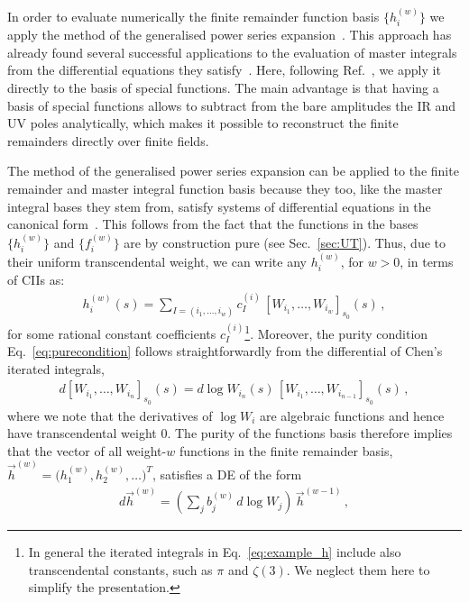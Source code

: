 \documentclass[main.tex]{subfiles}
\begin{document}
In order to evaluate numerically the finite remainder function basis $\{h^{(w)}_i\}$ we apply the method of the generalised power series expansion~\cite{Francesco:2019yqt}. This approach has already found several successful applications to the evaluation of master integrals from the differential equations they satisfy~\cite{Francesco:2019yqt,Bonciani:2019jyb,Frellesvig:2019byn,Abreu:2020jxa,Becchetti:2020wof,Bonciani:2021zzf,abreu2021twoloop}. Here, following Ref.~\cite{Badger:2021nhg}, we apply it directly to the basis of special functions. The main advantage is that having a basis of special functions allows to subtract from the bare amplitudes the IR and UV poles analytically, which makes it possible to reconstruct the finite remainders directly over finite fields. 

The method of the generalised power series expansion can be applied to the finite remainder and master integral function basis because they too, like the master integral bases they stem from, satisfy systems of differential equations in the canonical form~\cite{Henn:2013pwa}. This follows from the fact that the functions in the bases $\{h^{(w)}_i\}$ and $\{f^{(w)}_i\}$ are by construction pure (see Sec.~\ref{sec:UT}). Thus, due to their uniform transcendental weight, we can write any $h^{(w)}_i$, for $w>0$, in terms of CIIs as:
\begin{align} \label{eq:example_h}
h^{(w)}_{i}(s) = \sum_{I = (i_1,\ldots,i_w)} c_I^{(i)} \, \left[W_{i_1}, \ldots, W_{i_w}  \right]_{s_0} (s) \, ,
\end{align}
for some rational constant coefficients $c_I^{(i)}$\footnote{In general the iterated integrals in Eq.~\eqref{eq:example_h} include also transcendental constants, such as $\pi$ and $\zeta(3)$. We neglect them here to simplify the presentation.}.
Moreover, the purity condition Eq.~\ref{eq:purecondition} follows straightforwardly from the differential of Chen's iterated integrals,
\begin{align} \label{eq:ChenDerivative}
d \left[W_{i_1}, \ldots, W_{i_n}  \right]_{s_0} (s) = d \log W_{i_n}(s) \, \left[W_{i_1}, \ldots, W_{i_{n-1}}  \right]_{s_0} (s) \,,
\end{align}
where we note that the derivatives of $\log W_i$ are algebraic functions and hence have transcendental weight $0$.
The purity of the functions basis therefore implies that the vector of all weight-$w$ functions in the finite remainder basis, $\vec{h}^{(w)}= \bigl(h^{(w)}_1, h^{(w)}_2, \ldots \bigr)^T$, satisfies a DE of the form
\begin{align} \label{eq:dhw}
d \vec{h}^{(w)} = \left( \sum_{j} b_j^{(w)} \, d\log W_j  \right) \,  \vec{h}^{(w-1)} \,,
\end{align}
\end{document}
